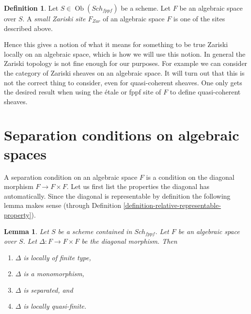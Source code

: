 \documentclass{stacks-project}
\theoremstyle{plain}
\newtheorem{lemma}[subsection]{Lemma}
\theoremstyle{definition}
\newtheorem{definition}[subsection]{Definition}
\theoremstyle{remark}
\numberwithin{equation}{subsection}
\def\Sch{\mathit{Sch}}
\def\Ob{\mathop{\mathrm{Ob}}\nolimits}
\begin{document}
\begin{definition}
\label{definition-small-Zariski-site}
Let $S \in \Ob(\Sch_{fppf})$ be a scheme. Let $F$ be an algebraic space over
$S$. A {\it small Zariski site $F_{Zar}$} of an algebraic space $F$ is one
of the sites described above.
\end{definition}

\noindent
Hence this gives a notion of what it means for something to be true
Zariski locally on an algebraic space, which is how we will use this
notion. In general the Zariski topology is not fine enough for our
purposes. For example we can consider the category of Zariski sheaves
on an algebraic space. It will turn out that this is not the
correct thing to consider, even for quasi-coherent sheaves.
One only gets the desired result when using the \'etale or fppf site of
$F$ to define quasi-coherent sheaves.











\section{Separation conditions on algebraic spaces}
\label{section-separation}

\noindent
A separation condition on an algebraic space $F$ is a condition
on the diagonal morphism $F \to F \times F$. Let us first
list the properties the diagonal has automatically.
Since the diagonal is representable by definition the following lemma
makes sense (through
Definition \ref{definition-relative-representable-property}).

\begin{lemma}
\label{lemma-properties-diagonal}
Let $S$ be a scheme contained in $\Sch_{fppf}$.
Let $F$ be an algebraic space over $S$.
Let $\Delta : F \to F \times F$ be the diagonal morphism.
Then
\begin{enumerate}
\item $\Delta$ is locally of finite type,
\item $\Delta$ is a monomorphism,
\item $\Delta$ is separated, and
\item $\Delta$ is locally quasi-finite.
\end{enumerate}
\end{lemma}
\end{document}

